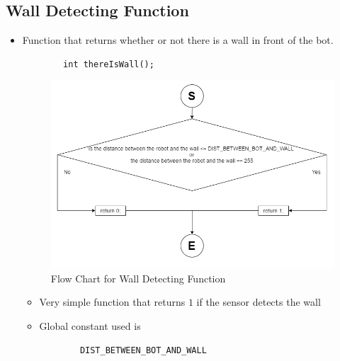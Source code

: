 \documentclass[11pt]{article}
\begin{document}

\subsection{Wall Detecting Function}
\begin{itemize}
\item Function that returns whether or not there is a wall in front of the bot.
	\begin{verbatim}
		int thereIsWall();
	\end{verbatim}
\begin{figure}[htp]
\centering
\includegraphics[scale=0.60]{images/Software_Flowchart/Detecting_Wall.png}
\caption{Flow Chart for Wall Detecting Function}
\label{}
\end{figure}
	\begin{itemize}
	\item Very simple function that returns $1$ if the sensor detects the wall
	\item Global constant used is
	\begin{verbatim}
		DIST_BETWEEN_BOT_AND_WALL
	\end{verbatim}
	\end{itemize}
\end{itemize}
\newpage

\end{document}
